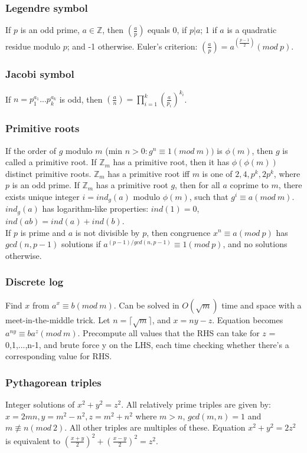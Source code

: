 \documentclass[a4paper,12pt]{article}
\begin{document}
\subsubsection{Legendre symbol}
If $p$ is an odd prime, $a \in \mathbb{Z}$, then $(\frac{a}{p})$ equals 0, if $p|a$; 1 if $a$ is a quadratic residue modulo $p$; and -1 otherwise. Euler's criterion: $(\frac{a}{p}) = a^{(\frac{p-1}{2})} (mod\ p)$.

\subsubsection{Jacobi symbol}
If $n = p_1^{a_1}...p_k^{a_k}$ is odd, then $(\frac{a}{n}) = \prod_{i=1}^k(\frac{a}{p_i})^{k_i}$.

\subsubsection{Primitive roots}
If the order of $g$ modulo $m$ (min $n > 0: g^n \equiv 1 (mod\ m))$ is $\phi(m)$, then $g$ is called a primitive root.
If $\mathbb{Z}_m$ has a primitive root, then it has $\phi(\phi(m))$ distinct primitive roots.
$\mathbb{Z}_m$ has a primitive root iff $m$ is one of $2, 4, p^k, 2p^k$, where $p$ is an odd prime. If $\mathbb{Z}_m$ has a primitive root $g$, then for all $a$ coprime to $m$, there exists unique integer $i = ind_g(a)$ modulo $\phi(m)$,
such that $g^i \equiv a (mod\ m)$. $ind_g(a)$ has logarithm-like properties: $ind(1) = 0$, $ind(ab) = ind(a) + ind(b)$.\\
If $p$ is prime and $a$ is not divisible by $p$, then congruence $x^n \equiv a (mod\ p)$ has $gcd(n, p - 1)$ solutions if $a^{(p-1)/ gcd(n,p-1)} \equiv 1 (mod\ p)$, and no solutions otherwise.

\subsubsection{Discrete log}
Find $x$ from $a^x \equiv b (mod\ m)$. Can be solved in $O(\sqrt{m})$ time and space with a meet-in-the-middle trick. Let $n = \lceil \sqrt{m} \rceil$, and $x = ny - z$. Equation becomes $a^{ny} \equiv ba^z (mod\ m)$.
Precompute all values that the RHS can take for $z$ = 0,1,...,n-1, and brute force y on the LHS, each time checking whether there’s a corresponding value for RHS.

\subsubsection{Pythagorean triples}
Integer solutions of $x^2 + y^2 = z^2$. All relatively prime triples are given by: $x = 2mn, y = m^2 - n^2, z = m^2 + n^2$ where $m > n$, $gcd(m,n) = 1$ and $m \not\equiv n (mod\ 2)$. All other triples
are multiples of these. Equation $x^2 + y^2 = 2z^2$ is equivalent to $(\frac{x+y}{2})^2 + (\frac{x-y}{2})^2 = z^2$.
\end{document}

